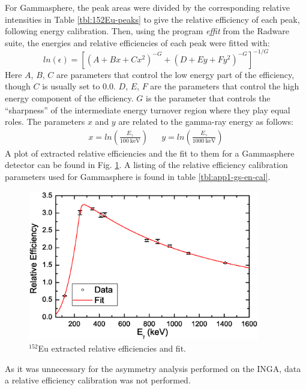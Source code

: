For Gammasphere, the peak areas were divided by the corresponding relative intensities in Table \ref{tbl:152Eu-peaks} to give the relative efficiency of each peak, following energy calibration. Then, using the program \emph{effit} from the Radware suite, the energies and relative efficiencies of each peak were fitted with:
\begin{equation}
\label{eqn:chp3-eff_cal} 
ln(\epsilon) = [(A+Bx+Cx^2)^{-G} + (D+Ey+Fy^2)^{-G}]^{-1/G}
\end{equation}
Here $A$, $B$, $C$ are parameters that control the low energy part of the efficiency, though $C$ is usually set to $0.0$. $D$, $E$, $F$ are the parameters that control the high energy component of the efficiency. $G$ is the parameter that controls the ``sharpness'' of the intermediate energy turnover region where they play equal roles. The parameters $x$ and $y$ are related to the gamma-ray energy as follows:
\begin{align*}
\label{eqn:chp3-eff_x_and_y}
x=ln(\frac{E_{\gamma{}}}{100~\textrm{keV}}) && y=ln(\frac{E_{\gamma{}}}{1000~\textrm{keV}})
\end{align*}
A plot of extracted relative efficiencies and the fit to them for a Gammasphere detector can be found in Fig. \ref{fig:chp3-gs-eff-plot}. A listing of the relative efficiency calibration parameters used for Gammasphere is found in table \ref{tbl:app1-gs-en-cal}.

\begin{figure}[h!]
	\centerline{\includegraphics[width=0.9\textwidth]{./img/c3/gs_eff_plot.eps}}
	\caption{$^{152}$Eu extracted relative efficiencies and fit.}
	\label{fig:chp3-gs-eff-plot}
\end{figure}

As it was unnecessary for the asymmetry analysis performed on the INGA, data a relative efficiency calibration was not performed. %

